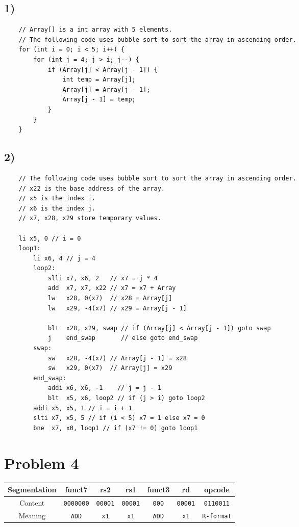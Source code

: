 \documentclass[a4paper,12pt]{article}
\begin{document}
\subsection*{1)}

\begin{verbatim}
	// Array[] is a int array with 5 elements.
	// The following code uses bubble sort to sort the array in ascending order.
	for (int i = 0; i < 5; i++) {
		for (int j = 4; j > i; j--) {
			if (Array[j] < Array[j - 1]) {
				int temp = Array[j];
				Array[j] = Array[j - 1];
				Array[j - 1] = temp;
			}
		}
	}
\end{verbatim}

\subsection*{2)}

\begin{verbatim}
	// The following code uses bubble sort to sort the array in ascending order.
	// x22 is the base address of the array.
	// x5 is the index i.
	// x6 is the index j.
	// x7, x28, x29 store temporary values.

	li x5, 0 // i = 0
	loop1:
		li x6, 4 // j = 4
		loop2:
			slli x7, x6, 2   // x7 = j * 4
			add  x7, x7, x22 // x7 = x7 + Array
			lw   x28, 0(x7)  // x28 = Array[j]
			lw   x29, -4(x7) // x29 = Array[j - 1]

			blt  x28, x29, swap // if (Array[j] < Array[j - 1]) goto swap
			j    end_swap       // else goto end_swap
		swap:
			sw   x28, -4(x7) // Array[j - 1] = x28
			sw   x29, 0(x7)  // Array[j] = x29
		end_swap:
			addi x6, x6, -1    // j = j - 1
			blt  x5, x6, loop2 // if (j > i) goto loop2
		addi x5, x5, 1 // i = i + 1
		slti x7, x5, 5 // if (i < 5) x7 = 1 else x7 = 0
		bne  x7, x0, loop1 // if (x7 != 0) goto loop1
\end{verbatim}

\section*{Problem 4}

\begin{center}
	\begin{tabular}{ccccccc}
		\toprule
		Segmentation & funct7 & rs2 & rs1 & funct3 & rd & opcode \\
		\midrule
		Content & \texttt{0000000} & \texttt{00001} & \texttt{00001} & \texttt{000} & \texttt{00001} & \texttt{0110011} \\
		Meaning & \texttt{ADD} & \texttt{x1} & \texttt{x1} & \texttt{ADD} & \texttt{x1} & \texttt{R-format} \\
		\bottomrule
	\end{tabular}
\end{center}
\end{document}
